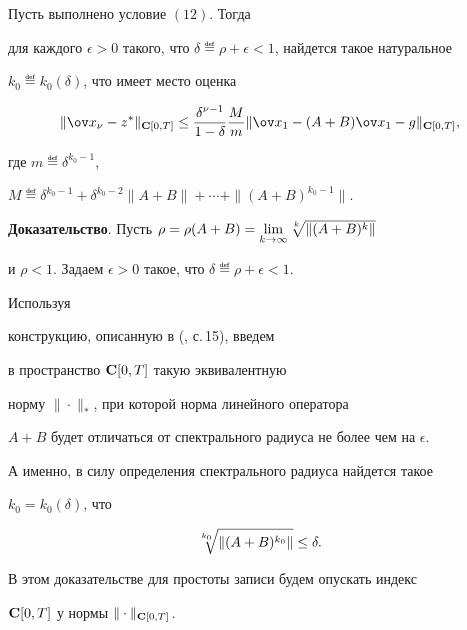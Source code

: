 \begin{thm}


Пусть выполнено условие $(12)$. Тогда


для каждого ${\epsilon}>0$ такого, что ${\delta}


\eqdef {\rho}+{\epsilon}<1$, найдется такое натуральное


$k_0\eqdef k_0({\delta})$, что имеет место оценка


$$


\|{\ov x_{\nu}}-z^*\|_{\bold C[0,T]}


\le \frac{{\delta}^{{\nu}-1}}{1-{\delta}} \frac{M}{m}


\|{\ov x_1}-(A+B){\ov x_1}-g\|_{\bold C[0,T]},


$$


где $m\eqdef {\delta}^{k_0-1}$,


$M\eqdef {\delta}^{k_0-1}+{\delta}^{k_0-2}\|A+B\|+\dotsb+


\|(A+B)^{k_0-1}\|$.


\end{thm}





{\bf Доказательство}. Пусть ${\rho}={\rho}(A+B)=


\lim\limits_{k\to \infty }\sqrt[\uproot{2}k]{\| (A+B)^k\|}$


и ${\rho}<1$. Задаем ${\epsilon}>0$ такое, что ${\delta}


\eqdef {\rho}+{\epsilon}<1$.


Используя


конструкцию, описанную в (\cite{6}, с.\,15), введем


в пространство ${\bold C}[0,T]$ такую эквивалентную


норму $\|\cdot\|_*$, при которой норма линейного оператора


$A+B$ будет отличаться от спектрального радиуса не более чем на ${\epsilon}$.


А именно, в силу определения спектрального радиуса найдется такое


$k_0=k_0({\delta})$, что


$$


\sqrt[\uproot{3}{k_0}]{\| (A+B)^{k_0}\|}\le {\delta}.


$$


В этом доказательстве для простоты записи будем опускать индекс


${\bold C}[0,T]$ у нормы $\|\cdot\|_{\bold C[0,T]}$.





